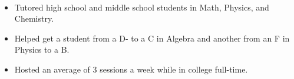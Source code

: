 \\
\begin{itemize}
    \item Tutored high school and middle school students in Math, Physics, and Chemistry.
    \item Helped get a student from a D- to a C in Algebra and another from an F in Physics to a B.
    \item Hosted an average of 3 sessions a week while in college full-time.
\end{itemize}